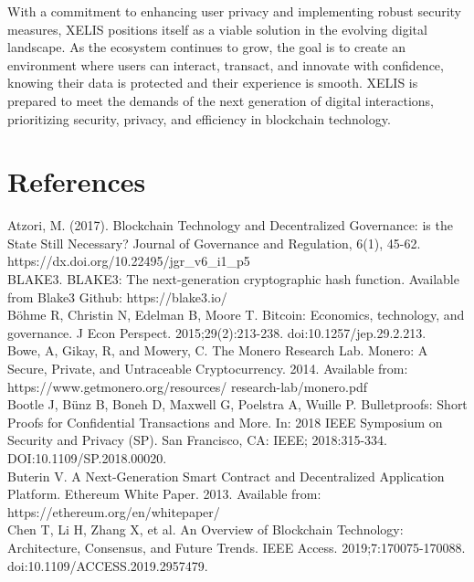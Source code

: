 \documentclass[10pt,a4paper,twocolumn]{article}
\begin{document}
With a commitment to enhancing user privacy and implementing robust security measures, XELIS positions itself as a viable solution in the evolving digital landscape. As the ecosystem continues to grow, the goal is to create an environment where users can interact, transact, and innovate with confidence, knowing their data is protected and their experience is smooth. XELIS is prepared to meet the demands of the next generation of digital interactions, prioritizing security, privacy, and efficiency in blockchain technology.\\

\newpage

\section{References}

Atzori, M. (2017). Blockchain Technology and Decentralized Governance: is the State Still Necessary? Journal of Governance and Regulation, 6(1), 45-62. https://dx.doi.org/10.22495/jgr\_v6\_i1\_p5 \\

BLAKE3. BLAKE3: The next-generation cryptographic hash function. Available from Blake3 Github: https://blake3.io/\\

Böhme R, Christin N, Edelman B, Moore T. Bitcoin: Economics, technology, and governance. J Econ Perspect. 2015;29(2):213-238. doi:10.1257/jep.29.2.213.\\

Bowe, A, Gikay, R, and Mowery, C. The Monero Research Lab. Monero: A Secure, Private, and Untraceable Cryptocurrency. 2014. Available from: https://www.getmonero.org/resources/ research-lab/monero.pdf \\

Bootle J, Bünz B, Boneh D, Maxwell G, Poelstra A, Wuille P. Bulletproofs: Short Proofs for Confidential Transactions and More. In: 2018 IEEE Symposium on Security and Privacy (SP). San Francisco, CA: IEEE; 2018:315-334. DOI:10.1109/SP.2018.00020.\\

Buterin V. A Next-Generation Smart Contract and Decentralized Application Platform. Ethereum White Paper. 2013. Available from: https://ethereum.org/en/whitepaper/\\

Chen T, Li H, Zhang X, et al. An Overview of Blockchain Technology: Architecture, Consensus, and Future Trends. IEEE Access. 2019;7:170075-170088. doi:10.1109/ACCESS.2019.2957479.\\
\end{document}
